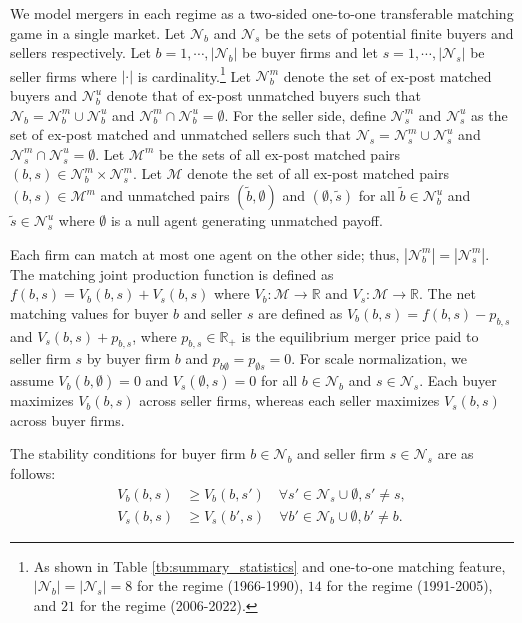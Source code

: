 \documentclass[10pt]{article}
\begin{document}
We model mergers in each regime as a two-sided one-to-one transferable matching game in a single market. Let $\mathcal{N}_b$ and $\mathcal{N}_s$ be the sets of potential finite buyers and sellers respectively. Let $b=1,\cdots,|\mathcal{N}_b|$ be buyer firms and let $s=1,\cdots,|\mathcal{N}_s|$ be seller firms where $|\cdot|$ is cardinality.\footnote{As shown in Table \ref{tb:summary_statistics} and one-to-one matching feature, $|\mathcal{N}_b|=|\mathcal{N}_s|=8$ for the regime (1966-1990), $14$ for the regime
(1991-2005), and $21$ for the regime (2006-2022).} Let $\mathcal{N}_{b}^{m}$ denote the set of ex-post matched buyers and $\mathcal{N}_{b}^{u}$ denote that of ex-post unmatched buyers such that $\mathcal{N}_b= \mathcal{N}_{b}^{m}\cup\mathcal{N}_{b}^{u}$ and $\mathcal{N}_{b}^{m}\cap\mathcal{N}_{b}^{u}=\emptyset$. For the seller side, define %
$\mathcal{N}_{s}^{m}$ and $\mathcal{N}_{s}^{u}$ as the set of ex-post matched and unmatched sellers such that $\mathcal{N}_s= \mathcal{N}_{s}^{m}\cup\mathcal{N}_{s}^{u}$ and $\mathcal{N}_{s}^{m}\cap\mathcal{N}_{s}^{u}=\emptyset$. 
Let $\mathcal{M}^m$ be the sets of all ex-post matched pairs $(b,s)\in\mathcal{N}_{b}^{m}\times \mathcal{N}_{s}^{m}$. Let $\mathcal{M}$ denote the set of all ex-post matched pairs $(b,s)\in\mathcal{M}^{m}$ and unmatched pairs $(\tilde{b},\emptyset)$ and $(\emptyset,\tilde{s})$ for all $\tilde{b}\in \mathcal{N}_b^u$ and $\tilde{s}\in \mathcal{N}_s^u$ where $\emptyset$ is a null agent generating unmatched payoff. 

Each firm can match at most one agent on the other side; thus,  $|\mathcal{N}_b^{m}|=|\mathcal{N}_s^{m}|$. The matching joint production function is defined as $f(b,s)=V_b(b,s)+V_s(b,s)$ where $V_b:\mathcal{M}\rightarrow \mathbb{R}$ and $V_s:\mathcal{M}\rightarrow \mathbb{R}$. The net matching values for buyer $b$ and seller $s$ are defined as $V_b(b,s)=f(b,s)-p_{b,s}$ and $V_s(b,s)+p_{b,s}$, where $p_{b,s}\in \mathbb{R}_{+}$ is the equilibrium merger price paid to seller firm $s$ by buyer firm $b$ and $p_{b\emptyset}=p_{\emptyset s}=0$. For scale normalization, we assume $V_b(b,\emptyset)=0$ and $V_s(\emptyset,s)=0$ for all $b\in \mathcal{N}_b$ and $s\in \mathcal{N}_s$. Each buyer maximizes $V_b(b,s)$ across seller firms, whereas each seller maximizes $V_s(b,s)$ across buyer firms. 

The stability conditions for buyer firm $b \in \mathcal{N}_b$ and seller firm $s \in \mathcal{N}_s$ are as follows:
\begin{align}
    V_b(b,s) &\ge V_b(b,s') \quad \forall s' \in \mathcal{N}_s \cup \emptyset,s'\neq s,\label{eq:stability_ineq}\\
    V_s(b,s) &\ge V_s(b',s) \quad \forall b' \in \mathcal{N}_b\cup \emptyset,b'\neq b.\nonumber
\end{align}
\end{document}
